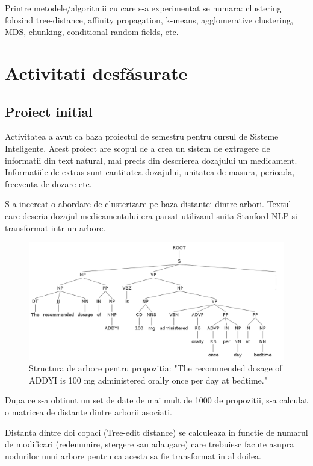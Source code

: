\documentclass[a4paper,12pt]{article}
\begin{document}
 Printre metodele/algoritmii cu care s-a experimentat se numara: clustering folosind tree-distance, affinity propagation, k-means, agglomerative clustering, MDS, chunking, conditional random fields, etc. 

\clearpage
\section{Activita{\cb t}i desf{\u a}{\cb s}urate}

\subsection{Proiect ini{\cb t}ial}

Activitatea a avut ca baza proiectul de semestru pentru cursul de Sisteme Inteligente. Acest proiect are scopul de a crea un sistem de extragere de informatii din text natural, mai precis din descrierea dozajului un medicament. Informatiile de extras sunt cantitatea dozajului, unitatea de masura, perioada, frecventa de dozare etc.

S-a incercat o abordare de clusterizare pe baza distantei dintre arbori. Textul care descria dozajul medicamentului era parsat utilizand suita Stanford NLP si transformat intr-un arbore.

  \begin{figure}[h]
 \includegraphics[width=12cm]{Tree.png}
 \caption{Structura de arbore pentru propozitia: "The recommended dosage of ADDYI is 100 mg administered orally once per day at bedtime."}
 \end{figure}

Dupa ce s-a obtinut un set de date de mai mult de 1000 de propozitii, s-a calculat o matricea de distante dintre arborii asociati. 

Distanta dintre doi copaci (Tree-edit distance) se calculeaza in functie de numarul de modificari (redenumire, stergere sau adaugare) care trebuiesc facute asupra nodurilor unui arbore pentru ca acesta sa fie transformat in al doilea.
\end{document}
